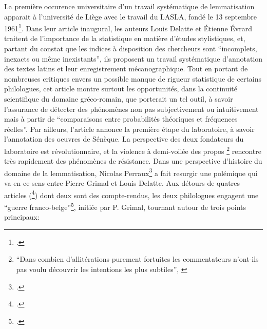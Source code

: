 La première occurence universitaire d'un travail systématique de lemmatisation apparait à l'université de Liège avec le travail du LASLA, fondé le 13 septembre 1961\footcite{delatte_laboratoire_1961}. Dans leur article inaugural, les auteurs Louis Delatte et Étienne Évrard traitent de l'importance de la statistique en matière d'études stylistiques, et, partant du constat que les indices à disposition des chercheurs sont \enquote{incomplets, inexacts ou même inexistants}, ils proposent un travail systématique d'annotation des textes latins et leur enregistrement mécanographique. Tout en portant de nombreuses critiques envers un possible manque de rigueur statistique de certains philologues, cet article montre surtout les opportunités, dans la continuité scientifique du domaine gréco-romain, que porterait un tel outil, à savoir l'assurance de détecter des phénomènes non pas subjectivement ou intuitivement mais à partir de \enquote{comparaisons entre probabilités théoriques et fréquences réelles}. Par ailleurs, l'article annonce la première étape du laboratoire, à savoir l'annotation des oeuvres de Sénèque. La perspective des deux fondateurs du laboratoire est révolutionnaire, et la violence à demi-voilée des propos \footnote{\enquote{Dans combien d'allitérations purement fortuites les commentateurs n'ont-ils pas voulu découvrir les intentions les plus subtiles}, \cite[p.~442]{delatte_laboratoire_1961}} rencontre très rapidement des phénomènes de résistance. Dans une perspective d'histoire du domaine de la lemmatisation, Nicolas Perraux\footcite{perreaux_lemmatisation_2019} a fait resurgir une polémique qui va en ce sens entre Pierre Grimal et Louis Delatte. Aux détours de quatres articles (\footcites{grimal_delatte_1964}{delatte_propos_1965}{grimal_index_1966}{delatte_index_1968}) dont deux sont des compte-rendus, les deux philologues engagent une \enquote{guerre franco-belge}\footcite{verdiere_pierre_1970}, initiée par P. Grimal, tournant autour de trois points principaux:
